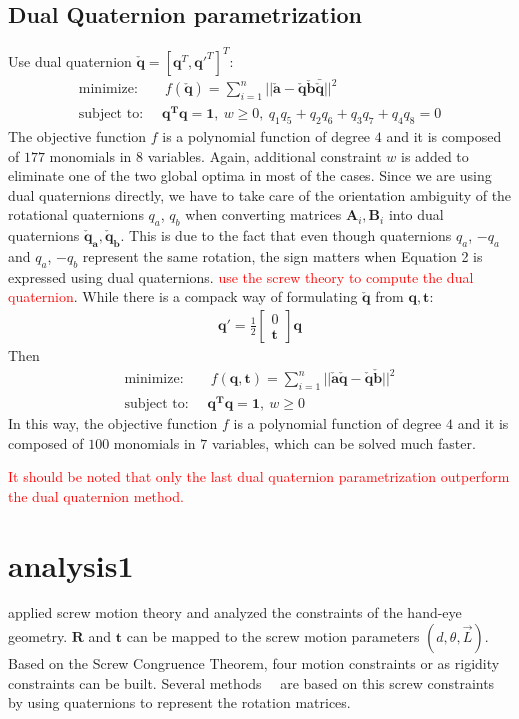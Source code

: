 \subsection{Dual Quaternion parametrization}
Use dual quaternion $\check{\mathbf{q}}=[\mathbf{q}^T, \mathbf{q'}^T]^T$:
\begin{align}
\text{minimize: }\ &\ f(\mathbf{\check{q}})=\sum_{i=1}^{n} 
||\mathbf{\check{a}-\check{q}\check{b}\bar{\check{q}}}||^2 \\
\text{subject to: }\ & \mathbf{q^Tq=1},\ w \geq 0,\ q_1q_5+q_2q_6+q_3q_7+q_4q_8=0
\end{align}
The objective function $f$ is a polynomial function of degree $4$ and it is composed of $177$ monomials in $8$ variables. Again, additional constraint $w$ is added to eliminate one of the two global optima in most of the
cases. Since we are using dual quaternions directly, we have to take care of the orientation ambiguity of the rotational quaternions $q_a$, $q_b$ when converting matrices $\mathbf{A}_i, \mathbf{B}_i$ into dual quaternions $\mathbf{\check{q}_a}, \mathbf{\check{q}_b}$. This is due to the fact that even though quaternions $q_a$, $-q_a$ and $q_a$, $-q_b$ represent the same rotation, the sign matters when Equation 2 is expressed using dual
quaternions. \textcolor{red}{use the screw theory to compute the dual quaternion}.
While there is a compack way of formulating $\mathbf{\check{q}}$ from $\mathbf{q, t}$:
\begin{align}
\mathbf{q'}=\frac{1}{2} \left[ \begin{matrix}
0 \\ \mathbf{t}
\end{matrix}\right]\mathbf{q}
\end{align}
Then
\begin{align}
\text{minimize: }\ &\ f(\mathbf{q, t})=\sum_{i=1}^{n} 
||\mathbf{\check{a}\check{q}-\check{q}\check{b}}||^2 \\
\text{subject to: }\ & \mathbf{q^Tq=1},\ w \geq 0
\end{align}
In this way, the objective function $f$ is a polynomial function of degree $4$ and it is composed of $100$ monomials in $7$ variables, which can be solved much faster.

\textcolor{red}{It should be noted that only the last dual quaternion parametrization outperform the dual quaternion method.}

\section{analysis1}
\cite{chen1991screw} applied screw motion theory and analyzed the constraints of the hand-eye geometry. $\mathbf{R}$ and $\mathbf{t}$ can be mapped to the screw motion parameters $(d, \theta, \vec{L})$. Based on the Screw Congruence Theorem, four motion constraints or
as rigidity constraints can be built. Several methods~\cite{fassi2005hand}~\cite{zhao2009hand} are based on this screw constraints by using quaternions to represent the rotation matrices.

